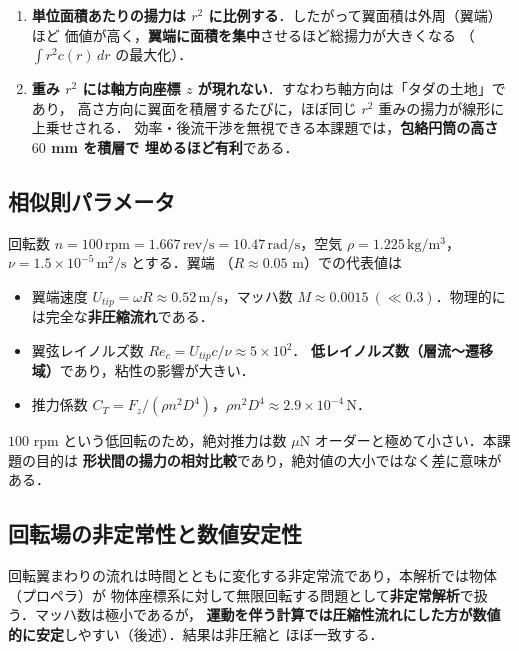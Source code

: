 \documentclass[a4paper,11pt]{jsarticle}
\begin{document}
\begin{enumerate}
  \item \textbf{単位面積あたりの揚力は $r^2$ に比例する}．したがって翼面積は外周（翼端）ほど
        価値が高く，\textbf{翼端に面積を集中}させるほど総揚力が大きくなる
        （$\int r^2 c(r)\,dr$ の最大化）．
  \item \textbf{重み $r^2$ には軸方向座標 $z$ が現れない}．すなわち軸方向は「タダの土地」であり，
        高さ方向に翼面を積層するたびに，ほぼ同じ $r^2$ 重みの揚力が線形に上乗せされる．
        効率・後流干渉を無視できる本課題では，\textbf{包絡円筒の高さ $60$ mm を積層で
        埋めるほど有利}である．
\end{enumerate}

\subsection{相似則パラメータ}

回転数 $n=100\,\mathrm{rpm}=1.667\,\mathrm{rev/s}=10.47\,\mathrm{rad/s}$，空気
$\rho=1.225\,\mathrm{kg/m^3}$，$\nu=1.5\times10^{-5}\,\mathrm{m^2/s}$ とする．翼端
（$R\approx0.05$ m）での代表値は

\begin{itemize}
  \item 翼端速度 $U_{tip}=\omega R \approx 0.52\,\mathrm{m/s}$，マッハ数
        $M\approx0.0015\ (\ll0.3)$．物理的には完全な\textbf{非圧縮流れ}である．
  \item 翼弦レイノルズ数 $Re_c=U_{tip}c/\nu \approx 5\times10^{2}$．
        \textbf{低レイノルズ数（層流〜遷移域）}であり，粘性の影響が大きい．
  \item 推力係数 $C_T=F_z/(\rho n^2 D^4)$，$\rho n^2 D^4\approx2.9\times10^{-4}\,\mathrm{N}$．
\end{itemize}

$100$ rpm という低回転のため，絶対推力は数 $\mu$N オーダーと極めて小さい．本課題の目的は
\textbf{形状間の揚力の相対比較}であり，絶対値の大小ではなく差に意味がある．

\subsection{回転場の非定常性と数値安定性}

回転翼まわりの流れは時間とともに変化する非定常流であり，本解析では物体（プロペラ）が
物体座標系に対して無限回転する問題として\textbf{非定常解析}で扱う．マッハ数は極小であるが，
\textbf{運動を伴う計算では圧縮性流れにした方が数値的に安定}しやすい（後述）．結果は非圧縮と
ほぼ一致する．
\end{document}
